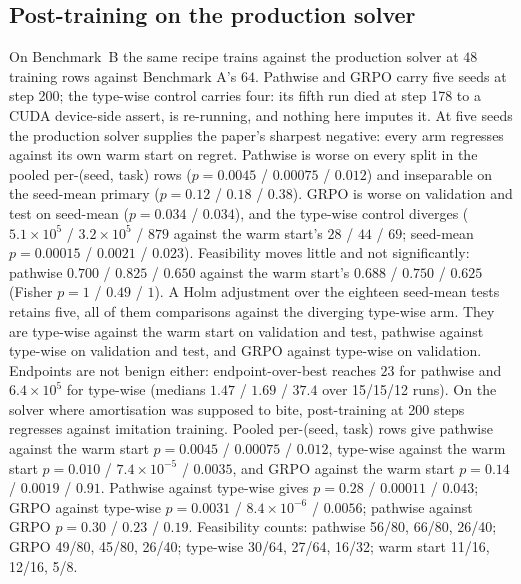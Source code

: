 \subsection{Post-training on the production solver}
\label{sec:e2B}
On Benchmark~B the same recipe trains against the production solver at $48$
training rows against Benchmark A's $64$.  Pathwise and GRPO carry five seeds at
step 200; the type-wise control carries four: its fifth run died at step 178 to a
CUDA device-side assert, is re-running, and nothing here imputes it.  At five seeds
the production solver supplies the paper's sharpest negative: every arm regresses
against its own warm start on regret.  Pathwise is worse on every split in the
pooled per-(seed, task) rows ($p=0.0045$ / $0.00075$ / $0.012$) and inseparable on
the seed-mean primary ($p=0.12$ / $0.18$ / $0.38$).  GRPO is worse on
validation and test on seed-mean ($p=0.034$ / $0.034$), and the type-wise control
diverges ($5.1\times10^{5}$ / $3.2\times10^{5}$ / $879$ against the warm start's
$28$ / $44$ / $69$; seed-mean $p=0.00015$ / $0.0021$ / $0.023$).  Feasibility moves
little and not significantly: pathwise $0.700$ / $0.825$ / $0.650$ against the warm
start's $0.688$ / $0.750$ / $0.625$ (Fisher $p=1$ / $0.49$ / $1$).  A Holm adjustment
over the eighteen seed-mean tests retains five, all of them comparisons against the
diverging type-wise arm.  They are type-wise against the warm start on validation and test,
pathwise against type-wise on validation and test, and GRPO against type-wise on
validation.  Endpoints are not benign either: endpoint-over-best reaches $23$ for
pathwise and $6.4\times10^{5}$ for type-wise (medians $1.47$ / $1.69$ / $37.4$ over
15/15/12 runs).  On the solver where amortisation was supposed to bite,
post-training at 200 steps regresses against imitation training.
Pooled per-(seed, task) rows give pathwise against the warm start $p=0.0045$ /
$0.00075$ / $0.012$, type-wise against the warm start $p=0.010$ / $7.4\times10^{-5}$
/ $0.0035$, and GRPO against the warm start $p=0.14$ / $0.0019$ / $0.91$.  Pathwise
against type-wise gives $p=0.28$ / $0.00011$ / $0.043$; GRPO against type-wise
$p=0.0031$ / $8.4\times10^{-6}$ / $0.0056$; pathwise against GRPO $p=0.30$ / $0.23$
/ $0.19$.  Feasibility counts: pathwise 56/80, 66/80, 26/40; GRPO 49/80, 45/80,
26/40; type-wise 30/64, 27/64, 16/32; warm start 11/16, 12/16, 5/8.


